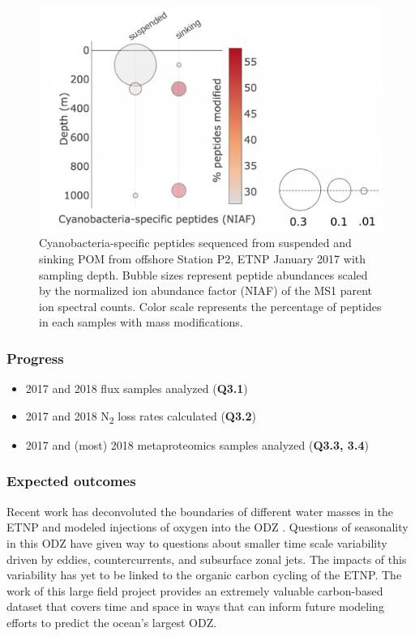 \documentclass[12pt, letterpaper, twoside]{article}
\begin{document}
\begin{figure}
	\includegraphics[width=\linewidth]{etnp2017-cyano-mods.jpg}
	\caption{Cyanobacteria-specific peptides sequenced from suspended and sinking POM from offshore Station P2, ETNP January 2017 with sampling depth. Bubble sizes represent peptide abundances scaled by the normalized ion abundance factor (NIAF) of the MS1 parent ion spectral counts. Color scale represents the percentage of peptides in each samples with mass modifications.}
	\label{fig:cyanomods}
\end{figure}

\subsubsection*{Progress}

\begin{itemize}
	\item 2017 and 2018 flux samples analyzed (\textbf{Q3.1})
	\item 2017 and 2018 N\textsubscript{2} loss rates calculated (\textbf{Q3.2})
	\item 2017 and (most) 2018 metaproteomics samples analyzed (\textbf{Q3.3, 3.4})
\end{itemize}


\subsubsection*{Expected outcomes}

Recent work has deconvoluted the boundaries of different water masses in the ETNP \cite{evans_role_nodate} and modeled injections of oxygen into the ODZ \cite{margolskee_ventilation_2019}. Questions of seasonality in this ODZ have given way to questions about smaller time scale variability driven by eddies, countercurrents, and subsurface zonal jets. The impacts of this variability has yet to be linked to the organic carbon cycling of the ETNP. The work of this large field project provides an extremely valuable carbon-based dataset that covers time and space in ways that can inform future modeling efforts to predict the ocean's largest ODZ. 
\end{document}

